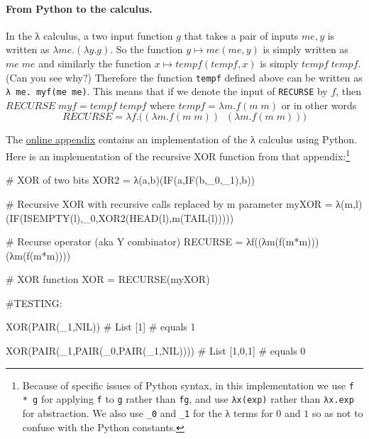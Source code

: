 \paragraph{From Python to the \lambda calculus.} In the λ calculus, a
two input function \(g\) that takes a pair of inputs \(me,y\) is written
as \(\lambda me.(\lambda y. g)\). So the function \(y \mapsto me(me,y)\)
is simply written as \(me\;me\) and similarly the function
\(x \mapsto tempf(tempf,x)\) is simply \(tempf\; tempf\). (Can you see
why?) Therefore the function \texttt{tempf} defined above can be written
as \texttt{λ me. myf(me me)}. This means that if we denote the input of
\texttt{RECURSE} by \(f\), then
\(\ensuremath{\mathit{RECURSE}}\; myf = tempf \; tempf\) where
\(tempf = \lambda m. f(m\; m)\) or in other words \[
\ensuremath{\mathit{RECURSE}} =  \lambda f.\bigl( (\lambda m. f(m\; m))\;\; (\lambda m. f(m \;m)) \bigr)
\]

The
\href{https://github.com/boazbk/nandnotebooks/blob/master/lambda.ipynb}{online
appendix} contains an implementation of the λ calculus using Python.
Here is an implementation of the recursive XOR function from that
appendix:\footnote{Because of specific issues of Python syntax, in this
  implementation we use \texttt{f * g} for applying \texttt{f} to
  \texttt{g} rather than \texttt{fg}, and use \texttt{λx(exp)} rather
  than \texttt{λx.exp} for abstraction. We also use \texttt{\_0} and
  \texttt{\_1} for the λ terms for \(0\) and \(1\) so as not to confuse
  with the Python constants.}

\begin{code}
# XOR of two bits
XOR2 = λ(a,b)(IF(a,IF(b,_0,_1),b))

# Recursive XOR with recursive calls replaced by m parameter
myXOR = λ(m,l)(IF(ISEMPTY(l),_0,XOR2(HEAD(l),m(TAIL(l)))))

# Recurse operator (aka Y combinator)
RECURSE = λf((λm(f(m*m)))(λm(f(m*m))))

# XOR function
XOR = RECURSE(myXOR)

#TESTING:

XOR(PAIR(_1,NIL)) # List [1]
# equals 1

XOR(PAIR(_1,PAIR(_0,PAIR(_1,NIL)))) # List [1,0,1]
# equals 0
\end{code}

